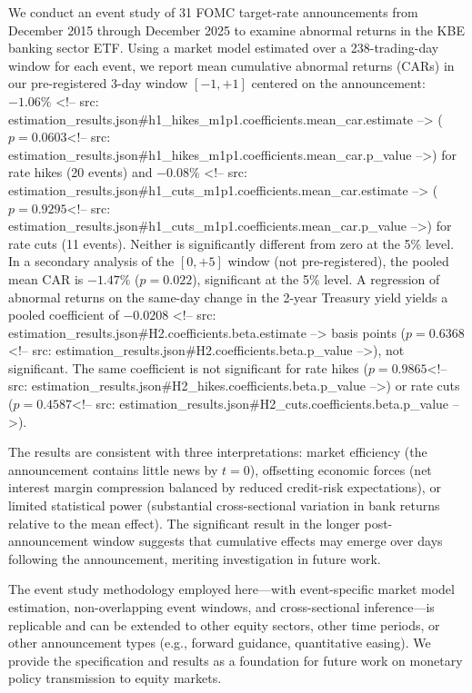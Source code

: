 \documentclass[11pt]{article}
\begin{document}
We conduct an event study of 31 FOMC target-rate announcements from December 2015 through December 2025 to examine abnormal returns in the KBE banking sector ETF. Using a market model estimated over a 238-trading-day window for each event, we report mean cumulative abnormal returns (CARs) in our pre-registered 3-day window $[-1, +1]$ centered on the announcement: $-1.06\%$ <!-- src: estimation_results.json#h1_hikes_m1p1.coefficients.mean_car.estimate --> ($p = 0.0603$<!-- src: estimation_results.json#h1_hikes_m1p1.coefficients.mean_car.p_value -->) for rate hikes (20 events) and $-0.08\%$ <!-- src: estimation_results.json#h1_cuts_m1p1.coefficients.mean_car.estimate --> ($p = 0.9295$<!-- src: estimation_results.json#h1_cuts_m1p1.coefficients.mean_car.p_value -->) for rate cuts (11 events). Neither is significantly different from zero at the 5\% level. In a secondary analysis of the $[0, +5]$ window (not pre-registered), the pooled mean CAR is $-1.47\%$ ($p = 0.022$), significant at the 5\% level. A regression of abnormal returns on the same-day change in the 2-year Treasury yield yields a pooled coefficient of $-0.0208$ <!-- src: estimation_results.json#H2.coefficients.beta.estimate --> basis points ($p = 0.6368$<!-- src: estimation_results.json#H2.coefficients.beta.p_value -->), not significant. The same coefficient is not significant for rate hikes ($p = 0.9865$<!-- src: estimation_results.json#H2_hikes.coefficients.beta.p_value -->) or rate cuts ($p = 0.4587$<!-- src: estimation_results.json#H2_cuts.coefficients.beta.p_value -->).

The results are consistent with three interpretations: market efficiency (the announcement contains little news by $t=0$), offsetting economic forces (net interest margin compression balanced by reduced credit-risk expectations), or limited statistical power (substantial cross-sectional variation in bank returns relative to the mean effect). The significant result in the longer post-announcement window suggests that cumulative effects may emerge over days following the announcement, meriting investigation in future work.

The event study methodology employed here—with event-specific market model estimation, non-overlapping event windows, and cross-sectional inference—is replicable and can be extended to other equity sectors, other time periods, or other announcement types (e.g., forward guidance, quantitative easing). We provide the specification and results as a foundation for future work on monetary policy transmission to equity markets.
\end{document}
